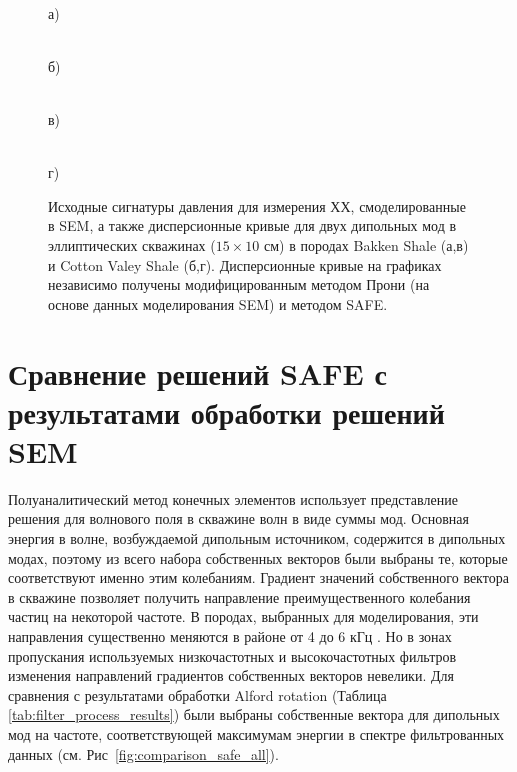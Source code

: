 \documentclass[a4paper,11pt]{article}
\begin{document}
\begin{figure}[h]
	\centering
	\begin{minipage}{0.49\linewidth}
		\centering %
		 \\
		а)
	\end{minipage}
	\begin{minipage}{0.49\linewidth}
		\centering %
		 \\
		б)
	\end{minipage}
	\begin{minipage}{0.49\linewidth}
		\centering %
		 \\
		в)
	\end{minipage}
	\begin{minipage}{0.49\linewidth}
		\centering %
		 \\
		г)
	\end{minipage}
	\caption{\footnotesize Исходные сигнатуры давления для измерения ХХ, смоделированные в SEM, а также дисперсионные кривые для двух дипольных мод в эллиптических скважинах ($15 \times 10$ см) в породах Bakken Shale (а,в) и Cotton Valey Shale (б,г). Дисперсионные кривые на графиках независимо получены модифицированным методом Прони (на основе данных моделирования SEM) и методом SAFE. }
	\label{fig:disp_curves_all}
\end{figure}

\section{Сравнение решений SAFE с результатами обработки решений SEM}
\label{safe_comparison}

Полуаналитический метод конечных элементов использует представление решения для волнового поля в скважине волн в виде суммы мод. Основная энергия в волне, возбуждаемой дипольным источником, содержится в дипольных модах, поэтому из всего набора собственных векторов были выбраны те, которые соответствуют именно этим колебаниям. Градиент значений собственного вектора в скважине позволяет получить направление преимущественного колебания частиц на некоторой частоте. В породах, выбранных для моделирования, эти направления существенно меняются в районе от 4 до 6 кГц \cite{Zharnikov2015}. Но в зонах пропускания используемых низкочастотных и высокочастотных фильтров изменения направлений градиентов собственных векторов невелики. Для сравнения с результатами обработки Alford rotation (Таблица \ref{tab:filter_process_results}) были выбраны собственные вектора для дипольных мод на частоте, соответствующей максимумам энергии в спектре фильтрованных данных (см. Рис~\ref{fig:comparison_safe_all}).
\end{document}
